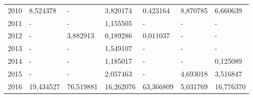 \begin{table}
\begin{tabular}{p{1cm}p{2cm}p{2cm}p{2cm}p{2cm}p{2cm}p{2cm}}
 2010 &                                  8,524378 &                                            - &   3,820174 &        0,423164 &                  8,870785 &               6,660639 \\
 2011 &                                         - &                                            - &   1,155505 &               - &                         - &                      - \\
 2012 &                                         - &                                     3,882913 &   0,189286 &        0,011037 &                         - &                      - \\
 2013 &                                         - &                                            - &   1,549107 &               - &                         - &                      - \\
 2014 &                                         - &                                            - &   1,185017 &               - &                         - &               0,125089 \\
 2015 &                                         - &                                            - &   2,057463 &               - &                  4,693018 &               3,516847 \\
 2016 &                                 19,434527 &                                    76,519881 &  16,262076 &       63,366809 &                  5,031769 &              16,776370 \\
\bottomrule
\end{tabular}
\end{table}
